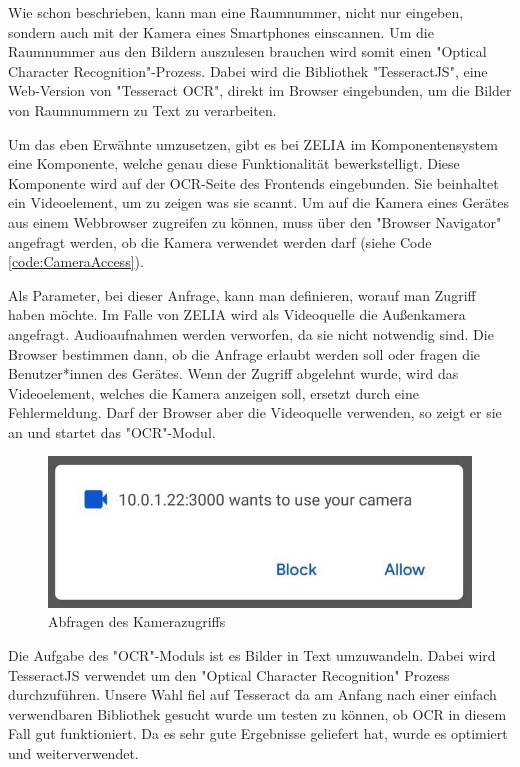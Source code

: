 

Wie schon beschrieben, kann man eine Raumnummer, nicht nur eingeben, sondern auch mit der Kamera eines Smartphones einscannen. Um die Raumnummer aus den Bildern auszulesen brauchen wird somit einen "Optical Character Recognition"-Prozess. Dabei wird die Bibliothek "TesseractJS", eine Web-Version von "Tesseract OCR", direkt im Browser eingebunden, um die Bilder von Raumnummern zu Text zu verarbeiten.\cite{TesseractJS}\cite{TesseractJSImplementation}

Um das eben Erwähnte umzusetzen, gibt es bei ZELIA im Komponentensystem eine Komponente, welche genau diese Funktionalität bewerkstelligt. Diese Komponente wird auf der OCR-Seite des Frontends eingebunden. Sie beinhaltet ein Videoelement, um zu zeigen was sie scannt. Um auf die Kamera eines Gerätes aus einem Webbrowser zugreifen zu können, muss über den "Browser Navigator" angefragt werden, ob die Kamera verwendet werden darf (siehe Code \ref{code:CameraAccess}).


Als Parameter, bei dieser Anfrage, kann man definieren, worauf man Zugriff haben möchte. Im Falle von ZELIA wird als Videoquelle die Außenkamera angefragt. Audioaufnahmen werden verworfen, da sie nicht notwendig sind. Die Browser bestimmen dann, ob die Anfrage erlaubt werden soll oder fragen die Benutzer*innen des Gerätes. Wenn der Zugriff abgelehnt wurde, wird das Videoelement, welches die Kamera anzeigen soll, ersetzt durch eine Fehlermeldung. Darf der Browser aber die Videoquelle verwenden, so zeigt er sie an und startet das "OCR"-Modul.

\begin{figure}[H]
    \centering
    \includegraphics[width=120mm]{media/OCR/cam_access_light.jpg}
    \caption{Abfragen des Kamerazugriffs}
\end{figure}


Die Aufgabe des "OCR"-Moduls ist es Bilder in Text umzuwandeln. Dabei wird TesseractJS verwendet um den "Optical Character Recognition" Prozess durchzuführen. Unsere Wahl fiel auf Tesseract da am Anfang nach einer einfach verwendbaren Bibliothek gesucht wurde um testen zu können, ob OCR in diesem Fall gut funktioniert. Da es sehr gute Ergebnisse geliefert hat, wurde es optimiert und weiterverwendet.


